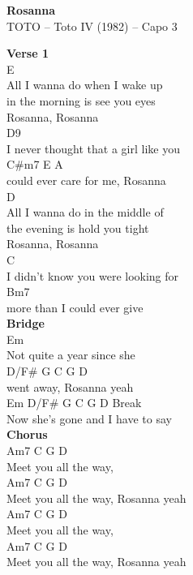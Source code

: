 \documentclass[a4paper]{article}
\begin{document}
    \begin{center}
        \textbf{Rosanna}
        ~\\
        TOTO -- Toto IV (1982)
         -- Capo 3
    \end{center}
    {
        \scriptsize
        \textbf{Verse 1}
        ~\\
        {
            \cutive
            \obeyspaces
E
\\
All I wanna do when I wake up
\\
in the morning is see you eyes
\\
Rosanna, Rosanna
\\
D9
\\
I never thought that a girl like you
\\
        C\#m7               E      A
\\
could ever care for me, Rosanna
\\
D
\\
All I wanna do in the middle of
\\
the evening is hold you tight
\\
Rosanna, Rosanna
\\
C
\\
I didn't know you were looking for
\\
           Bm7
\\
more than I could ever give
\\

        }
        \textbf{Bridge}
        ~\\
        {
            \cutive
            \obeyspaces
Em
\\
Not quite a year since she
\\
D/F\#    G     C   G     D
\\
went away, Rosanna yeah
\\
Em                       D/F\#  G     C  G D Break
\\
Now she's gone and I have to say
\\

        }
        \textbf{Chorus}
        ~\\
        {
            \cutive
            \obeyspaces
         Am7           C  G  D
\\
Meet you all the way,
\\
         Am7            C  G  D
\\
Meet you all the way, Rosanna yeah
\\
         Am7           C  G  D
\\
Meet you all the way,
\\
         Am7            C  G  D
\\
Meet you all the way, Rosanna yeah
\\

}}
\end{document}
